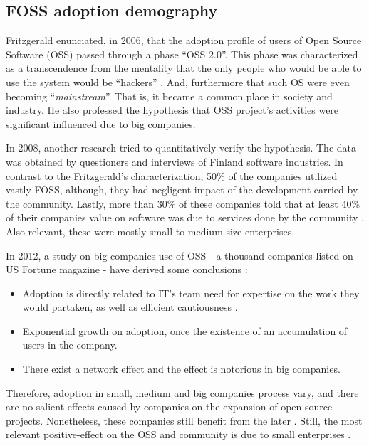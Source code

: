 \documentclass[
12pt,				%
openright,			%
oneside,			%
a4paper,			%
brazil,				%
english,			%
]{abntex2}
\begin{document}
\subsection{FOSS adoption demography}

Fritzgerald enunciated, in 2006, that the adoption profile of users of
Open Source Software (OSS) passed through a phase ``OSS 2.0''. This
phase was characterized as a transcendence from the mentality that the
only people who would be able to use the system would be ``hackers''
\cite{fitzgerald2006transformation}. And, furthermore that such OS
were even becoming ``\textit{mainstream}''. That is, it became a common
place in society and industry. He also professed the hypothesis that
OSS project's activities were significant influenced due to big companies. 

In 2008, another research tried to quantitatively verify the
hypothesis. The data was obtained by questioners and interviews of
Finland software industries. In contrast to the Fritzgerald's
characterization, 50\% of the companies utilized vastly FOSS,
although, they had negligent impact of the development carried by the
community. Lastly, more than 30\% of these companies told that at
least 40\% of their companies value on software was due to services
done by the community \cite{hauge2008adoption}. Also relevant, these
were mostly small to medium size enterprises.    

In 2012, a study on big companies use of OSS - a thousand companies listed on US
Fortune magazine - have derived some conclusions \cite{spinellis2012organizational}: 
\begin{itemize}
\item Adoption is directly related to IT's team need for expertise on
  the work they would partaken, as well as efficient cautiousness \cite{gallego2015open,
 li2013all}.
\item Exponential growth on adoption, once the existence of an
  accumulation of users in the company. 
\item There exist a network effect and the effect is notorious in big companies.  
\end{itemize}

Therefore, adoption in small, medium and big companies process vary,
and there are no salient effects caused by companies on the expansion
of open source projects. Nonetheless, these companies still benefit
from the later \cite{spinellis2012organizational,hauge2008adoption,
  fitzgerald2006transformation}. Still, the most relevant positive-effect on
the OSS and community is due to small enterprises \cite{kshetri2004economics}.  
\end{document}
